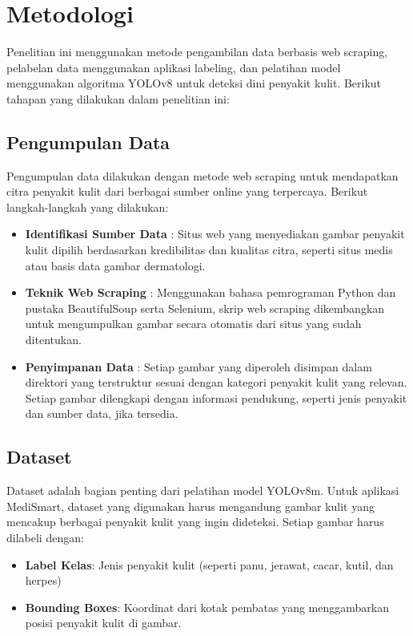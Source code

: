 \documentclass[journal,article,submit,pdftex,moreauthors]{Definitions/mdpi}
\begin{document}
\section{Metodologi}
Penelitian ini menggunakan metode pengambilan data berbasis web scraping, pelabelan data menggunakan aplikasi labeling, dan pelatihan model menggunakan algoritma YOLOv8 untuk deteksi dini penyakit kulit. Berikut tahapan yang dilakukan dalam penelitian ini:


\subsection{Pengumpulan Data}

Pengumpulan data dilakukan dengan metode web scraping untuk mendapatkan citra penyakit kulit dari berbagai sumber online yang terpercaya. Berikut langkah-langkah yang dilakukan:

\begin{itemize}
    \item \textbf{Identifikasi Sumber Data} : Situs web yang menyediakan gambar penyakit kulit dipilih berdasarkan kredibilitas dan kualitas citra, seperti situs medis atau basis data gambar dermatologi.

    \item \textbf{Teknik Web Scraping} :  Menggunakan bahasa pemrograman Python dan pustaka BeautifulSoup serta Selenium, skrip web scraping dikembangkan untuk mengumpulkan gambar secara otomatis dari situs yang sudah ditentukan.

    \item \textbf{Penyimpanan Data} :  Setiap gambar yang diperoleh disimpan dalam direktori yang terstruktur sesuai dengan kategori penyakit kulit yang relevan. Setiap gambar dilengkapi dengan informasi pendukung, seperti jenis penyakit dan sumber data, jika tersedia.
\end{itemize}

\subsection{Dataset}
Dataset adalah bagian penting dari pelatihan model YOLOv8m. Untuk aplikasi MediSmart, dataset yang digunakan harus mengandung gambar kulit yang mencakup berbagai penyakit kulit yang ingin dideteksi. Setiap gambar harus dilabeli dengan:

\begin{itemize}
    \item \textbf{Label Kelas}: Jenis penyakit kulit (seperti panu, jerawat, cacar, kutil, dan herpes)
    \item \textbf{Bounding Boxes}: Koordinat dari kotak pembatas yang menggambarkan posisi penyakit kulit di gambar.
\end{itemize}
\end{document}
